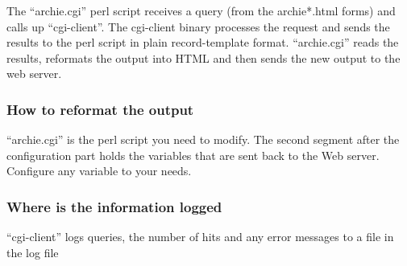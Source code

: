The ``archie.cgi'' perl script receives a query (from the archie*.html forms)
and calls up ``cgi-client''. The cgi-client binary processes the request and
sends the results to the perl script in plain record-template format.
``archie.cgi'' reads the results, reformats the output into HTML and then
sends the new output to the web server.



\subsubsection{How to reformat the output}

``archie.cgi'' is the perl script you need to modify.  The second segment
after the configuration part holds the variables that are sent back to the
Web server.  Configure any variable to your needs.
  

\subsubsection{Where is the information logged}

``cgi-client'' logs queries, the number of hits and any error messages to a
file in the log file 



